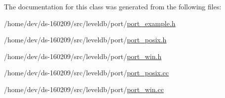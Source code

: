 The documentation for this class was generated from the following files\+:\begin{DoxyCompactItemize}
\item 
/home/dev/ds-\/160209/src/leveldb/port/\hyperlink{port__example_8h}{port\+\_\+example.\+h}\item 
/home/dev/ds-\/160209/src/leveldb/port/\hyperlink{port__posix_8h}{port\+\_\+posix.\+h}\item 
/home/dev/ds-\/160209/src/leveldb/port/\hyperlink{port__win_8h}{port\+\_\+win.\+h}\item 
/home/dev/ds-\/160209/src/leveldb/port/\hyperlink{port__posix_8cc}{port\+\_\+posix.\+cc}\item 
/home/dev/ds-\/160209/src/leveldb/port/\hyperlink{port__win_8cc}{port\+\_\+win.\+cc}\end{DoxyCompactItemize}
